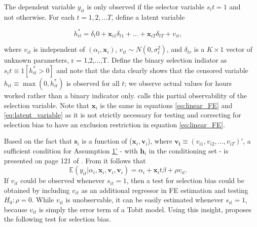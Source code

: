 \documentclass[a4paper,12pt]{article}
\theoremstyle{plain}
\theoremstyle{definition}
\theoremstyle{definition}
\theoremstyle{definition}
\theoremstyle{definition}
\begin{document}
The dependent variable $y_{it}$ is only observed if the selector variable $s_it=1$ and not otherwise. For each $t=1,2,...T$, define a latent variable

\begin{equation}
\label{eq:latent_variable}
    h_{it}^*= \delta_t0 + \mathbf{x}_{i1}\delta_{t1}+...+\mathbf{x}_{iT}\delta_{tT}+v_{it},
\end{equation}

where $v_{it}$ is independent of $(\alpha_i, \mathbf{x}_i)$, $v_{it}\sim N(0,\sigma_t^2)$, and $\delta_{tr}$ is a $K \times 1$ vector of unknown parameters, r = 1,2,...,T. Define the binary selection indiator as $s_it\equiv1[h_{it}^*>0]$ and note that the data clearly shows that the censored variable $h_{it}\equiv \max(0,h_{it}^*)$ is observed for all $t$; we observe actual values for hours worked rather than a binary indicator only. \citet{wooldridge1995} calls this partial observability of the selection variable. Note that $\mathbf{x}_i$ is the same in equations \ref{eq:linear_FE} and \ref{eq:latent_variable} as it is not strictly necessary for testing and correcting for selection bias to have an exclusion restriction in equation \ref{eq:linear_FE}.

Based on the fact that $\mathbf{s}_i$ is a function of ($\mathbf{x}_i, \mathbf{v}_i$), where $\mathbf{v_i}\equiv (v_{i1}, v_{i2},...,v_{iT})'$, a sufficient condition for Assumption \href{Assumption_1'}{1'} - with $\mathbf{h}_i$ in the conditioning set - is presented on page 121 of \citet{wooldridge1995}. From it follows that
\begin{equation}
    \mathbb{E}(y_{it}|\alpha_i, \mathbf{x}_i, \mathbf{v}_i, \mathbf{v}_i)=\alpha_i+\mathbf{x}_it \beta + \rho v_{it}.
\end{equation}
If $v_{it}$ could be observed whenever $s_{it}=1$, then a test for selection bias could be obtained by including $v_{it}$ as an additional regressor in FE estimation and testing $H_0: \rho=0$. While $v_{it}$ is unobservable, it can be easily estimated whenever $s_{it}=1$, because $v_{it}$ is simply the error term of a Tobit model. Using this insight, \citet{wooldridge1995} proposes the following test for selection bias.
\end{document}
